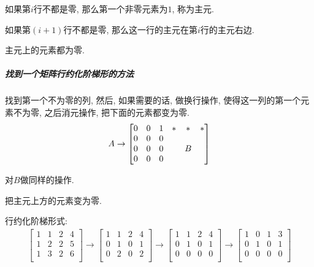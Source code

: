 如果第$i$行不都是零, 那么第一个非零元素为$1$, 称为主元.

如果第$(i+1)$行不都是零, 那么这一行的主元在第$i$行的主元右边.

主元上的元素都为零.

\subparagraph{找到一个矩阵行约化阶梯形的方法}
找到第一个不为零的列, 然后, 如果需要的话, 做换行操作, 使得这一列的第一个元素不为零, 之后消元操作, 把下面的元素都变为零.
\begin{equation}
  A \to \begin{bmatrix}
   0 & 0 & 1 & * & * & *\\
   0 & 0 & 0 &  &  & \\
   0 & 0 & 0 &  & \large{B} & \\
   0 & 0 & 0 &  &  & \\
  \end{bmatrix}
\end{equation}

对$B$做同样的操作.

把主元上方的元素变为零.

\begin{example}\label{reduction}
    行约化阶梯形式:
    \begin{equation}
      \begin{gathered}
        \begin{bmatrix}
         1 & 1 & 2 & 4\\
         1 & 2 & 2 & 5\\
         1 & 3 & 2 & 6\\
        \end{bmatrix}
        \longrightarrow
        \begin{bmatrix}
         1 & 1 & 2 & 4\\
         0 & 1 & 0 & 1\\
         0 & 2 & 0 & 2\\
        \end{bmatrix}
        \longrightarrow
        \begin{bmatrix}
         1 & 1 & 2 & 4\\
         0 & 1 & 0 & 1\\
         0 & 0 & 0 & 0\\
        \end{bmatrix}
        \longrightarrow
        \begin{bmatrix}
         1 & 0 & 1 & 3\\
         0 & 1 & 0 & 1\\
         0 & 0 & 0 & 0\\
        \end{bmatrix}
      \end{gathered}
    \end{equation}
\end{example}

